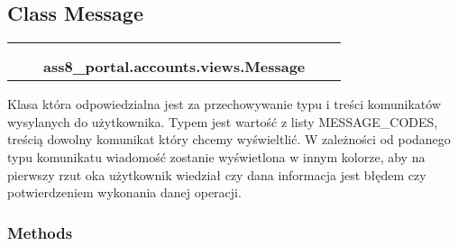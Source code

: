 
\subsection{Class Message}

    \label{ass8_portal:accounts:views:Message}
\begin{tabular}{cccccc}
\multicolumn{2}{r}{\settowidth{\BCL}{object}\multirow{2}{\BCL}{object}}
&&
  \\\cline{3-3}
  &&\multicolumn{1}{c|}{}
&&
  \\
&&\multicolumn{2}{l}{\textbf{ass8\_portal.accounts.views.Message}}
\end{tabular}

Klasa która odpowiedzialna jest za przechowywanie typu i treści komunikatów
wysylanych do użytkownika. Typem jest wartość z listy MESSAGE\_CODES, 
treścią dowolny komunikat który chcemy wyświeltlić. W zależności od 
podanego typu komunikatu wiadomość zostanie wyświetlona w innym kolorze, 
aby na pierwszy rzut oka użytkownik wiedział czy dana informacja jest 
błędem czy potwierdzeniem wykonania danej operacji.



  \subsubsection{Methods}

    \vspace{0.5ex}

